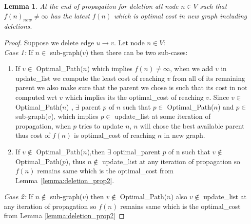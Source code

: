 \documentclass[a4paper]{article}
\newtheorem{lemma}[theorem]{Lemma}
\begin{document}
\begin{lemma}\label{lemma:deletion_prop4}
At the end of propagation for deletion all node  $ n \in V$  such that $f(n)_{new} \neq \infty $ has the latest $f(n)$ which is optimal cost in new graph including deletions.
\end{lemma}
\begin{proof} Suppose we delete edge $u \rightarrow v$. Let node $n \in V$:\\
\textit{Case 1:} If $n \in$ sub-graph($v$) then there can be two sub-cases: \begin{enumerate}
\item If $v \in$ Optimal\_Path($n$) which implies $f(n) \neq \infty$, when we add $v$ in update\_list we compute the least cost of reaching $v$ from all of its remaining parent we also make sure that the parent we chose is such that its cost in not computed wrt $v$ which implies its the optimal\_cost of reaching $v$. Since $v \in$ Optimal\_Path($n$) , $\exists$ parent $p$ of $n$ such that $p \in$ Optimal\_Path($n$) and $p \in$ sub-graph($v$), which implies $p \in$ update\_list at some iteration of propagation, when $p$ tries to update $n$, $n$ will chose the best available parent thus cost of $f(n)$ is optimal\_cost of reaching $n$ in new graph.
\item If $v \notin$ Optimal\_Path($n$),then $\exists$ optimal\_parent $p$ of n such that $v \notin $ Optimal\_Path($p$), thus $n \notin$ update\_list at any iteration of propagation so $f(n)$ remains same which is the optimal\_cost from Lemma~\ref{lemma:deletion_prop2}. 
\end{enumerate}
\textit{Case 2:} If $n \notin$ sub-graph($v$) then $v \notin$ Optimal\_Path($n$) also $v \notin$ update\_list at any iteration of propagation so $f(n)$ remains same which is the optimal\_cost from Lemma \ref{lemma:deletion_prop2}
\end{proof}
\end{document}
